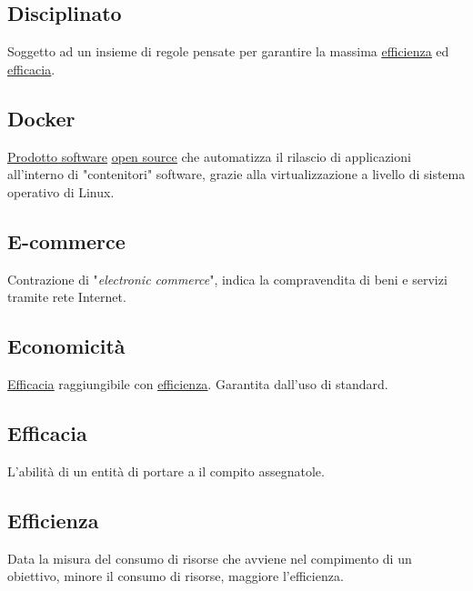 	\subsection{Disciplinato}
	\label{sec:disciplinato}
	Soggetto ad un insieme di regole pensate per garantire la massima \underline{\hyperref[sec:efficienza]{efficienza}} ed \underline{\hyperref[sec:efficacia]{efficacia}}.

	\subsection{Docker}
	\label{sec:docker}
	\underline{\hyperref[sec:prodottosoftware]{Prodotto software}} \underline{\hyperref[sec:opensource]{open source}} che automatizza il rilascio di applicazioni all'interno di "contenitori" software, grazie alla virtualizzazione a livello di sistema operativo di Linux.



	\subsection{E-commerce}
	\label{sec:ecommerce}
	Contrazione di "\emph{electronic commerce}", indica la compravendita di beni e servizi tramite rete Internet.

	\subsection{Economicità}
	\label{sec:economicita}
	\underline{\hyperref[sec:efficacia]{Efficacia}} raggiungibile con \underline{\hyperref[sec:efficienza]{efficienza}}. Garantita dall'uso di standard.

	\subsection{Efficacia}
	\label{sec:efficacia}
	L'abilità di un entità di portare a il compito assegnatole.

	\subsection{Efficienza}
	\label{sec:efficienza}
	Data la misura del consumo di risorse che avviene nel compimento di un obiettivo, minore il consumo di risorse, maggiore l'efficienza.

